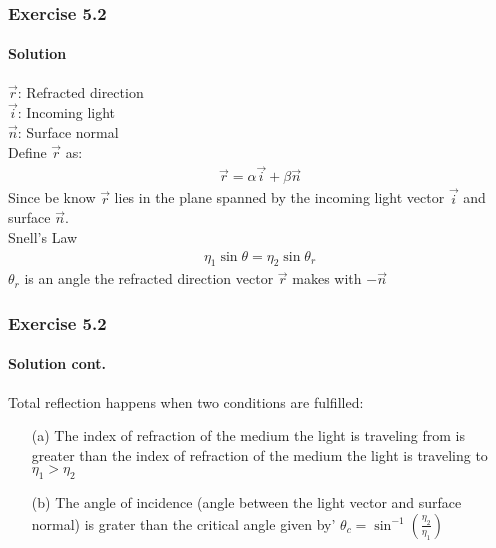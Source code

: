 \documentclass[11pt]{beamer}
\begin{document}
	\begin{frame}
		\frametitle{Exercise 5.2}
		\framesubtitle{Solution}
		$\vec{r}$: Refracted direction \\
		$\vec{i}$: Incoming light \\
		$\vec{n}$: Surface normal \\
				
		Define $\vec{r}$ as:
		\begin{align}
		\vec{r} = \alpha \vec{i} + \beta \vec{n}
		\end{align}
		Since be know $\vec{r}$ lies in the plane spanned by the incoming light vector $\vec{i}$ and surface $\vec{n}$. \\
		Snell's Law
		\begin{align}
		\eta_1 \sin \theta = \eta_2 \sin \theta_{r}
		\end{align}
		$\theta_{r}$ is an angle the refracted direction vector $\vec{r}$ makes with $-\vec{n}$		
		
	\end{frame}	
	
	\begin{frame}
		\frametitle{Exercise 5.2}
		\framesubtitle{Solution cont.}
		
		Total reflection happens when two conditions are fulfilled:
		
		\begin{enumerate}
\item[(a)] The index of refraction of the medium the light is traveling from is greater than the
index of refraction of the medium the light is traveling to
$\eta_1 > \eta_2$
\item[(b)] The angle of incidence (angle between the light vector and surface normal) is grater
than the critical angle given by'
$\theta_c = \sin^{-1} \left(\frac{\eta_2}{\eta_1}\right)$
\end{enumerate}
	\end{frame}		
\end{document}
